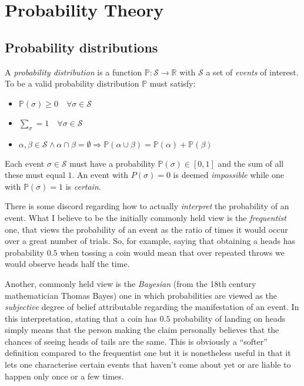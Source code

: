 \section{Probability Theory}

\subsection{Probability distributions} \label{subsec:probability-distributions}
\begin{definition}
	A \textit{probability distribution} is a function $\mathbb{P}: \mathcal{S} \rightarrow \mathbb{R}$ with $\mathcal{S}$ a set of \textit{events} of interest.  
To be a valid probability distribution $\mathbb{P}$ must satisfy:
\begin{itemize}
	\item $\mathbb{P}(\sigma) \geq 0 \quad \forall \sigma \in \mathcal{S}$
	\item $\sum_{\sigma} = 1 \quad \forall \sigma \in \mathcal{S}$
	\item $\alpha, \beta \in \mathcal{S} \wedge \alpha \cap \beta=\emptyset 	\Rightarrow \mathbb{P}(\alpha \cup \beta)=\mathbb{P}(\alpha)+\mathbb{P}(\beta)$
\end{itemize}
\end{definition}
Each event $\sigma \in \mathcal{S}$ must have a probability $\mathbb{P}(\sigma) \in [0,1]$ and the sum of all these must equal $1$. 
An event with $P(\sigma) = 0$ is deemed \textit{impossible} while one with $\mathbb{P}(\sigma) = 1$ is \textit{certain}.

There is some discord regarding how to actually \textit{interpret} the probability of an event.
What I believe to be the initially commonly held view is the \textit{frequentist} one, that views the probability of an event as the ratio of times it would occur over a great number of trials.  
So, for example, saying that obtaining a heads has probability $0.5$ when tossing a coin would mean that over repeated throws we would observe heads half the time.

Another, commonly held view is the \textit{Bayesian} (from the 18th century mathematician Thomas Bayes) one in which probabilities are viewed as the \textit{subjective} degree of belief attributable regarding the manifestation of an event.
In this interpretation, stating that a coin has $0.5$ probability of landing on heads simply means that the person making the claim personally believes that the chances of seeing heads of tails are the same.
This is obviously a ``softer'' definition compared to the frequentist one but it is nonetheless useful in that it lets one characterise certain events that haven't come about yet or are liable to happen only once or a few times.

